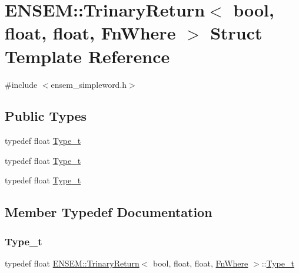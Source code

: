 \hypertarget{structENSEM_1_1TrinaryReturn_3_01bool_00_01float_00_01float_00_01FnWhere_01_4}{}\section{E\+N\+S\+EM\+:\+:Trinary\+Return$<$ bool, float, float, Fn\+Where $>$ Struct Template Reference}
\label{structENSEM_1_1TrinaryReturn_3_01bool_00_01float_00_01float_00_01FnWhere_01_4}


{\ttfamily \#include $<$ensem\+\_\+simpleword.\+h$>$}

\subsection*{Public Types}
\begin{DoxyCompactItemize}
\item 
typedef float \mbox{\hyperlink{structENSEM_1_1TrinaryReturn_3_01bool_00_01float_00_01float_00_01FnWhere_01_4_a1e5c651d668076e9bbd52f373bc583bd}{Type\+\_\+t}}
\item 
typedef float \mbox{\hyperlink{structENSEM_1_1TrinaryReturn_3_01bool_00_01float_00_01float_00_01FnWhere_01_4_a1e5c651d668076e9bbd52f373bc583bd}{Type\+\_\+t}}
\item 
typedef float \mbox{\hyperlink{structENSEM_1_1TrinaryReturn_3_01bool_00_01float_00_01float_00_01FnWhere_01_4_a1e5c651d668076e9bbd52f373bc583bd}{Type\+\_\+t}}
\end{DoxyCompactItemize}


\subsection{Member Typedef Documentation}
\mbox{\label{structENSEM_1_1TrinaryReturn_3_01bool_00_01float_00_01float_00_01FnWhere_01_4_a1e5c651d668076e9bbd52f373bc583bd}} 
\subsubsection{\texorpdfstring{Type\_t}{Type\_t}\hspace{0.1cm}{\footnotesize\ttfamily [1/3]}}
{\footnotesize\ttfamily typedef float \mbox{\hyperlink{structENSEM_1_1TrinaryReturn}{E\+N\+S\+E\+M\+::\+Trinary\+Return}}$<$ bool, float, float, \mbox{\hyperlink{structENSEM_1_1FnWhere}{Fn\+Where}} $>$\+::\mbox{\hyperlink{structENSEM_1_1TrinaryReturn_3_01bool_00_01float_00_01float_00_01FnWhere_01_4_a1e5c651d668076e9bbd52f373bc583bd}{Type\+\_\+t}}}

